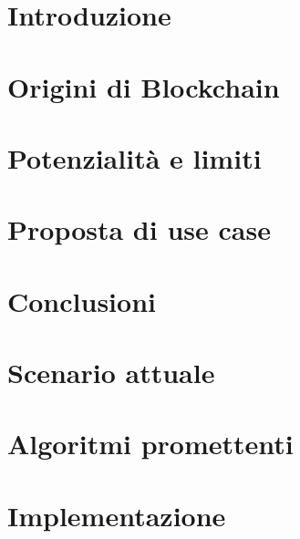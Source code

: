 \documentclass[12pt,twoside]{report}
\begin{document}
%





\tableofcontents
\listoffigures

\chapter{Introduzione}


\chapter{Origini di Blockchain}


\chapter{Potenzialità e limiti}


\chapter{Proposta di use case}


\chapter{Conclusioni}


\appendix
\chapter{Scenario attuale}


\chapter{Algoritmi promettenti}


\chapter{Implementazione}


{}

\end{document}
